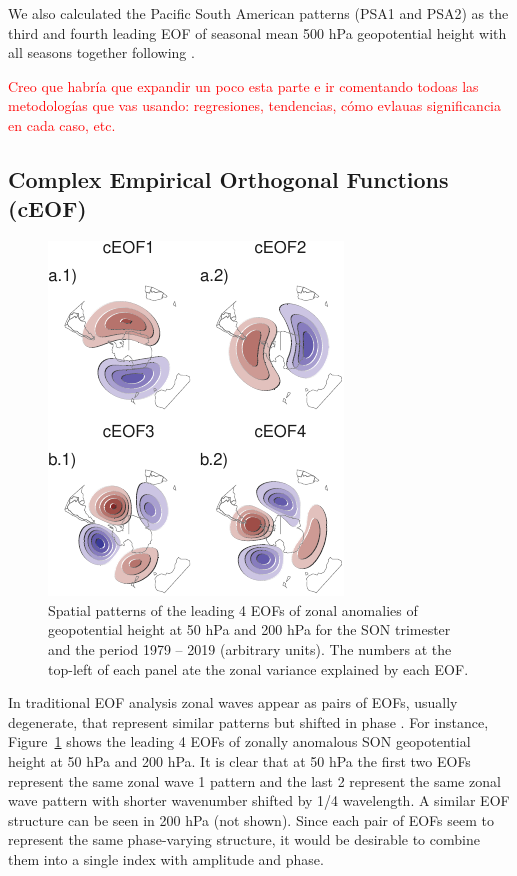 \documentclass[smallextended]{svjour3}       %
\begin{document}
We also calculated the Pacific South American patterns (PSA1 and PSA2) as the third and fourth leading EOF of seasonal mean 500 hPa geopotential height with all seasons together following \citet{mo2001}.

\textcolor{red}{Creo que habría que expandir un poco esta parte e ir comentando todoas las metodologías que vas usando: regresiones, tendencias, cómo evlauas significancia en cada caso, etc. }

\hypertarget{complex-empirical-orthogonal-functions-ceof}{%
\subsection{Complex Empirical Orthogonal Functions (cEOF)}\label{complex-empirical-orthogonal-functions-ceof}}



\begin{figure}
\centering
\includegraphics{../figures/eof-naive-1.pdf}
\caption{\label{fig:eof-naive}Spatial patterns of the leading 4 EOFs of zonal anomalies of geopotential height at 50 hPa and 200 hPa for the SON trimester and the period 1979 -- 2019 (arbitrary units). The numbers at the top-left of each panel ate the zonal variance explained by each EOF.}
\end{figure}

In traditional EOF analysis zonal waves appear as pairs of EOFs, usually degenerate, that represent similar patterns but shifted in phase \citep{horel1984}. For instance, Figure~\ref{fig:eof-naive} shows the leading 4 EOFs of zonally anomalous SON geopotential height at 50 hPa and 200 hPa. It is clear that at 50 hPa the first two EOFs represent the same zonal wave 1 pattern and the last 2 represent the same zonal wave pattern with shorter wavenumber shifted by 1/4 wavelength. A similar EOF structure can be seen in 200 hPa (not shown). Since each pair of EOFs seem to represent the same phase-varying structure, it would be desirable to combine them into a single index with amplitude and phase.
\end{document}
